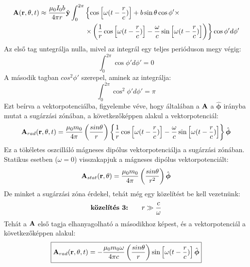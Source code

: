 \documentclass[a4paper,12pt]{article}
\begin{document}
\begin{equation}
    \begin{aligned}
        \bold{A}(\bold{r}, \theta, t) \approx \frac{\mu_0 I_0 b}{4 \pi r} \hat{\bold{y}} \int_0^{2 \pi} &\left\{\cos \left[\omega (t - \frac{r}{c}) \right] + b \sin \theta \cos \phi' \times \right. \\
        &\left. \times \left(\frac{1}{r} \cos \left[\omega (t - \frac{r}{c})\right]  - \frac{\omega}{c} \sin \left[\omega (t - \frac{r}{c})\right]\right) \right\} \cos \phi' d\phi'
    \end{aligned}
\end{equation}
Az első tag untegrálja nulla, mivel az integrál egy teljes perióduson megy végig:
\begin{equation}
    \int_0^{2 \pi} \cos \phi' d\phi' = 0
\end{equation}
A második tagban $cos^2 \phi'$ szerepel, aminek az integrálja:
\begin{equation}
    \int_0^{2 \pi} \cos^2 \phi' d\phi' = \pi
\end{equation}
Ezt beírva a vektorpotenciálba, figyelembe véve, hogy általában a $\bold{A}$ a $\hat{\boldsymbol{\phi}}$ irányba mutat a sugárzási zónában, a következőképpen alakul a vektorpotenciál:
\begin{equation}
    \bold{A}_{rad}(\bold{r}, \theta, t) = \frac{\mu_0 m_0}{4 \pi} \left(\frac{sin \theta}{r}\right) \left\{\frac{1}{r} \cos \left[\omega (t - \frac{r}{c})\right] - \frac{\omega}{c} \sin \left[\omega (t - \frac{r}{c})\right] \right\} \hat{\boldsymbol{\phi}}
\end{equation}
Ez a tökéletes oszcilláló mágneses dipólus vektorpotenciálja a sugárzási zónában. Statikus esetben ($\omega = 0$) visszakapjuk a mágneses dipólus vektorpotenciált:
\begin{equation}
    \bold{A}_{stat}(\bold{r}, \theta) = \frac{\mu_0 m_0}{4 \pi} \left(\frac{sin \theta}{r^2}\right) \hat{\boldsymbol{\phi}}
\end{equation}
De minket a sugárzási zóna érdekel, tehát még egy közelítést be kell vezetnünk:
\begin{equation}
    \text{\textbf{közelítés 3:}} \qquad r \gg \frac{c}{\omega}
\end{equation}
Tehát a $\bold{A}$ első tagja elhanyagolható a másodikhoz képest, és a vektorpotenciál a következőképpen alakul:
\begin{equation}
    \boxed{\bold{A}_{rad}(\bold{r}, \theta, t) = - \frac{\mu_0 m_0 \omega}{4 \pi c} \left(\frac{sin \theta}{r}\right) \sin \left[\omega (t - \frac{r}{c})\right] \hat{\boldsymbol{\phi}}}
\end{equation}
\end{document}
